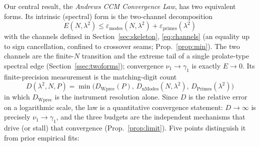 \documentclass[11pt,a4paper]{article}
\begin{document}
\noindent Our central result, the \emph{Andrews CCM Convergence Law}, has two
equivalent forms. Its intrinsic (spectral) form is the two-channel decomposition
\begin{equation}\label{eq:main-intrinsic}
  \boxed{\;E(N,\lambda^2)\le\varepsilon_{\mathrm{modes}}(N,\lambda^2)
         +\varepsilon_{\mathrm{primes}}(\lambda^2)\;}
\end{equation}
with the channels defined in Section~\ref{sec:skeleton},
\eqref{eq:channels} (an equality up to sign cancellation, confined to
crossover seams; Prop.~\ref{prop:min}). The two channels are the finite-$N$ transition and the extreme tail of a single
prolate-type spectral edge (Section~\ref{ssec:twoforms}); convergence
$\nu_1\to\gamma_1$ is exactly $E\to0$. Its finite-precision measurement is the
matching-digit count
\begin{equation}\label{eq:main}
  \boxed{\;D(\lambda^2,N,P)=\min\!\bigl(D_{\mathrm{Wprec}}(P),\,
  D_{\mathrm{nModes}}(N,\lambda^2),\,D_{\mathrm{Primes}}(\lambda^2)\bigr)\;}
\end{equation}
in which $D_{\mathrm{Wprec}}$ is the instrument resolution alone. Since $D$ is the
relative error on a logarithmic scale, the law is a quantitative convergence
statement: $D\to\infty$ is precisely $\nu_1\to\gamma_1$, and the three budgets
are the independent mechanisms that drive (or stall) that convergence
(Prop.~\ref{prop:limit}). Five points
distinguish it from prior empirical fits:
\end{document}
